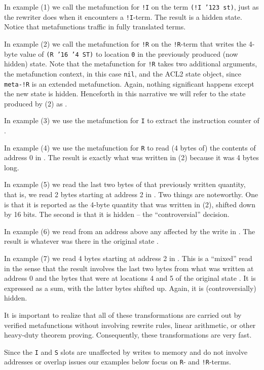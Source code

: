 \documentclass[submission,copyright,creativecommons]{eptcs}
\newcommand{\ptt}[1]{\tt{#1}}
\begin{document}
In example {\rm{(1)}} we call the metafunction for {\ptt{!I}} on the term {\ptt{(!I '123 st)}},
just as the rewriter does when it encounters a {\ptt{!I}}-term.  The result is
a hidden state.  Notice that metafunctions traffic in fully translated terms.

In example {\rm{(2)}} we call the metafunction for {\ptt{!R}} on the {\ptt{!R}}-term
that writes the 4-byte value of {\ptt{(R '16 '4 ST)}} to location {\ptt{0}} in
the previously produced (now hidden) state.  Note that the metafunction for {\ptt{!R}}
takes two additional arguments, the metafunction context, in this case {\ptt{nil}}, and the ACL2 state object,
since {\ptt{meta-!R}} is an extended metafunction.  Again, nothing significant happens
except the new state is hidden.   Henceforth in this narrative we will refer to the
state produced by {\rm{(2)}} as .

In example {\rm{(3)}} we use the metafunction for {\ptt{I}} to extract the instruction counter
of .

In example {\rm{(4)}} we use the metafunction for {\ptt{R}} to read (4 bytes of) the
contents of address 0 in .  The result is exactly what was written in {\rm{(2)}}
because it was 4 bytes long.

In example {\rm{(5)}} we read the last two bytes of that previously written
quantity, that is, we read 2 bytes starting at address 2 in .  Two things
are noteworthy.  One is that it is reported as the 4-byte quantity that was
written in {\rm{(2)}}, shifted down by 16 bits.  The second is that it is hidden -- the
``controversial'' decision.

In example {\rm{(6)}} we read from an address above any affected by the write in .
The result is whatever was there in the original state .

In example {\rm{(7)}} we read 4 bytes starting at address 2 in .  This is a
``mixed'' read in the sense that the result involves the last two bytes from
what was written at address 0 and the bytes that were at locations 4 and 5 of
the original state .  It is expressed as a sum, with the latter bytes
shifted up.  Again, it is (controversially) hidden.

It is important to realize that all of these transformations are carried out
by verified metafunctions without involving rewrite rules, linear arithmetic,
or other heavy-duty theorem proving.  Consequently, these transformations
are very fast.

Since the {\ptt{I}} and {\ptt{S}} slots are unaffected by writes to memory
and do not involve addresses or overlap issues our examples below focus on
{\ptt{R}}- and {\ptt{!R}}-terms.
\end{document}
